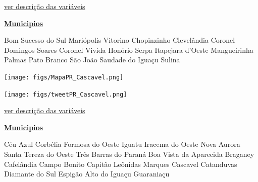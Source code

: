 \documentclass[10pt]{article} %
\begin{document}
\begin{minipage}[t]{.66\linewidth}
\begin{center}

\end{center}
\small{\hyperlink{vartab}{ver descrição das variáveis}}\end{minipage}\hfill\begin{minipage}[t]{.30\linewidth}
\begin{mdframed}[style=sidebar,frametitle={}]
\textbf{\hyperlink{municips}{Municipios}}\begin{itemize}\gsquare Bom Sucesso do Sul 
\gsquare Mariópolis 
\gsquare Vitorino 
\gsquare Chopinzinho 
\gsquare Clevelândia 
\gsquare Coronel Domingos Soares 
\gsquare Coronel Vivida 
\gsquare Honório Serpa 
\gsquare Itapejara d'Oeste 
\gsquare Mangueirinha 
\gsquare Palmas 
\gsquare Pato Branco 
\gsquare São João 
\gsquare Saudade do Iguaçu 
\gsquare Sulina 
\end{itemize}\BackToContents\end{mdframed}\hfill\end{minipage}\newpage\begin{minipage}[t]{.66\linewidth}
\hypertarget{Cscv}{}
\texttt{[image: figs/MapaPR\_Cascavel.png]}\vspace{0.5cm}\vspace{0.5cm}\begin{center}
\texttt{[image: figs/tweetPR\_Cascavel.png]}\end{center}
\begin{center}

\end{center}
\small{\hyperlink{vartab}{ver descrição das variáveis}}\end{minipage}\hfill\begin{minipage}[t]{.30\linewidth}
\begin{mdframed}[style=sidebar,frametitle={}]
\textbf{\hyperlink{municips}{Municipios}}\begin{itemize}\gsquare Céu Azul 
\gsquare Corbélia 
\gsquare Formosa do Oeste 
\gsquare Iguatu 
\gsquare Iracema do Oeste 
\gsquare Nova Aurora 
\gsquare Santa Tereza do Oeste 
\gsquare Três Barras do Paraná 
\gsquare Boa Vista da Aparecida 
\gsquare Braganey 
\gsquare Cafelândia 
\gsquare Campo Bonito 
\gsquare Capitão Leônidas Marques 
\gsquare Cascavel 
\gsquare Catanduvas 
\gsquare Diamante do Sul 
\gsquare Espigão Alto do Iguaçu 
\gsquare Guaraniaçu 

\end{itemize}
\end{mdframed}
\end{minipage}
\end{document}
